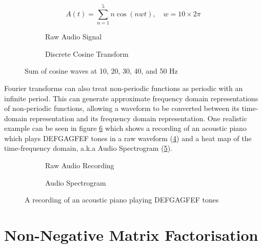 \begin{equation} 
\label{eq1:sum-five-freq}
A(t)=\sum_{n=1}^{5}n\cos(nwt),\quad w=10\times2\pi
\end{equation}

\begin{figure}[ht]
\centering
\begin{subfigure}{0.45\textwidth}
    
    \caption{Raw Audio Signal}
    \label{fig:idct}
\end{subfigure}
\hfill
\begin{subfigure}{0.45\textwidth}
    
    \caption{Discrete Cosine Transform}
    \label{fig:dct}
\end{subfigure}
\caption{Sum of cosine waves at 10, 20, 30, 40, and 50 Hz}
\label{fig:dct-idct}
\end{figure}

Fourier transforms can also treat non-periodic functions as periodic with an infinite period. This can generate approximate frequency domain representations of non-periodic functions, allowing a waveform to be converted between its time-domain representation and its frequency domain representation. One realistic example can be seen in figure \ref{fig:piano-wav-spec} which shows a recording of an acoustic piano which plays DEFGAGFEF tones in a raw waveform (\ref{fig:piano-wav}) and a heat map of the time-frequency domain, a.k.a Audio Spectrogram (\ref{fig:piano-spec}).

\begin{figure}[ht]
\centering
\begin{subfigure}{0.49\textwidth}
    
    \caption{Raw Audio Recording}
    \label{fig:piano-wav}
\end{subfigure}
\hfill
\begin{subfigure}{0.49\textwidth}
    
    \caption{Audio Spectrogram}
    \label{fig:piano-spec}
\end{subfigure}
\caption{A recording of an acoustic piano playing DEFGAGFEF tones}
\label{fig:piano-wav-spec}
\end{figure}

\section{Non-Negative Matrix Factorisation}
\label{sec:nmf}

